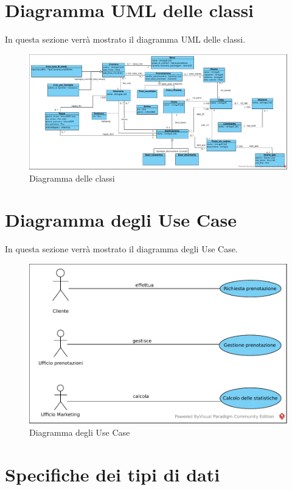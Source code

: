 \documentclass{article}
\begin{document}
\newpage
\section{Diagramma UML delle classi}

In questa sezione verrà mostrato il diagramma UML delle classi.
\begin{figure}[h]
    \centering
    \includegraphics[width=\textwidth]{../Diagramma delle classi.pdf}
    \caption{Diagramma delle classi}
\end{figure}

\newpage

\section{Diagramma degli Use Case}

In questa sezione verrà mostrato il diagramma degli Use Case.
\begin{figure}[h]
    \centering
    \includegraphics[width=\textwidth]{../Diagramma degli Use Case.pdf}
    \caption{Diagramma degli Use Case}
\end{figure}

\newpage
\section{Specifiche dei tipi di dati}
\end{document}
